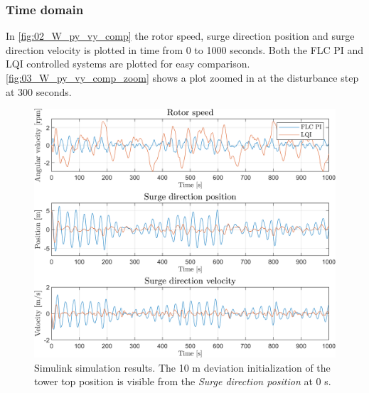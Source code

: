 \subsubsection{Time domain}
In \cref{fig:02_W_py_vy_comp} the rotor speed, surge direction position and surge direction velocity is plotted in time from 0 to 1000 seconds. Both the FLC PI and LQI controlled systems are plotted for easy comparison. \cref{fig:03_W_py_vy_comp_zoom} shows a plot zoomed in at the disturbance step at 300 seconds.
%
%

\begin{figure}[ht]
	\centering
	\includegraphics[width=0.7\linewidth]{Graphics/TestResults/linearModPerf/sim_11_W_py_vy_comp.png}
	\caption{Simulink simulation results. The 10 m deviation initialization of the tower top position is visible from the \textit{Surge direction position} at 0 s.}
	\label{fig:sim_02_W_py_vy_comp}
\end{figure}

